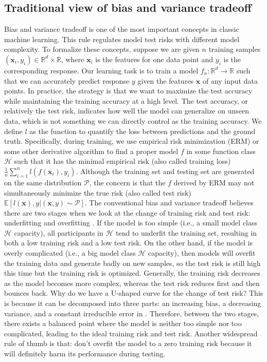 \documentclass{article}
\begin{document}
\subsection{Traditional view of bias and variance tradeoff}
\vspace{-1mm}
Bias and variance tradeoff is one of the most important concepts in classic machine learning. This rule regulates model test risks with different model complexity. To formalize these concepts, suppose we are given $n$ training samples $(\mathbf{x}_i, y_i) \in \mathbb{R}^d \times \mathbb{R}$, where $\mathbf{x}_i$ is the features for one data point and $y_i$ is the corresponding response. Our learning task is to train a model $f_n: \mathbb{R}^d \to \mathbb{R}$ such that we can accurately predict response $y$ given the features $\mathbf{x}$ of any input data points. In practice, the strategy is that we want to maximize the test accuracy while maintaining the training accuracy at a high level. The test accuracy, or relatively the test risk, indicates how well the model can generalize on unseen data, which is not something we can directly control as the training accuracy. We define $l$ as the function to quantify the loss between predictions and the ground truth. Specifically, during training, we use empirical risk minimization (ERM) or some other derivative algorithm to find a proper model $f$ in some function class $\mathcal{H}$ such that it has the minimal empirical risk (also called training loss) $\frac{1}{n}\sum_{i=1}^nl(f(\mathbf{x}_i), y_i)$. Although the training set and testing set are generated on the same distribution $\mathcal{P}$, the concern is that the $f$ derived by ERM may not simultaneously minimize the true risk (also called test risk) $\mathbb{E}[l(\mathbf{x}), y|(\mathbf{x}, y) \sim \mathcal{P}]$. The conventional bias and variance tradeoff believes there are two stages when we look at the change of training risk and test risk: underfitting and overfitting \cite{hastie2009elements}. If the model is too simple (i.e., a small model class $\mathcal{H}$ capacity), all participants in $\mathcal{H}$ tend to underfit the training set, resulting in both a low training risk and a low test risk. On the other hand, if the model is overly complicated (i.e., a big model class $\mathcal{H}$ capacity), then models will overfit the training data and generate badly on new samples, so the test risk is still high this time but the training risk is optimized. Generally, the training risk decreases as the model becomes more complex, whereas the test risk reduces first and then bounces back. Why do we have a U-shaped curve for the change of test risk? This is because it can be decomposed into three parts: an increasing bias, a decreasing variance, and a constant irreducible error in \cite{neville2008bias}. Therefore, between the two stages, there exists a balanced point where the model is neither too simple nor too complicated, leading to the ideal training risk and test risk. Another widespread rule of thumb is that: don't overfit the model to a zero training risk because it will definitely harm its performance during testing.
\end{document}
